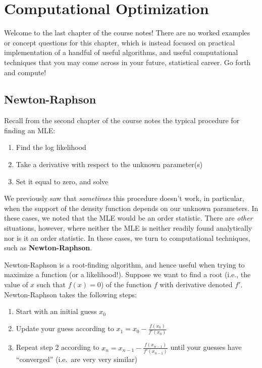 \documentclass[
  letterpaper,
  DIV=11,
  numbers=noendperiod]{scrreprt}
\begin{document}

\chapter{Computational Optimization}\label{computational-optimization}

Welcome to the last chapter of the course notes! There are no worked
examples or concept questions for this chapter, which is instead focused
on practical implementation of a handful of useful algorithms, and
useful computational techniques that you may come across in your future,
statistical career. Go forth and compute!

\section{Newton-Raphson}\label{newton-raphson}

Recall from the second chapter of the course notes the typical procedure
for finding an MLE:

\begin{enumerate}
\def\labelenumi{\arabic{enumi}.}
\item
  Find the log likelihood
\item
  Take a derivative with respect to the unknown parameter(s)
\item
  Set it equal to zero, and solve
\end{enumerate}

We previously saw that \emph{sometimes} this procedure doesn't work, in
particular, when the support of the density function depends on our
unknown parameters. In these cases, we noted that the MLE would be an
order statistic. There are \emph{other} situations, however, where
neither the MLE is neither readily found analytically nor is it an order
statistic. In these cases, we turn to computational techniques, such as
\textbf{Newton-Raphson}.

Newton-Raphson is a root-finding algorithm, and hence useful when trying
to maximize a function (or a likelihood!). Suppose we want to find a
root (i.e., the value of \(x\) such that \(f(x) = 0\)) of the function
\(f\) with derivative denoted \(f'\). Newton-Raphson takes the following
steps:

\begin{enumerate}
\def\labelenumi{\arabic{enumi}.}
\item
  Start with an initial guess \(x_0\)
\item
  Update your guess according to \(x_1 = x_0 - \frac{f(x_0)}{f'(x_0)}\)
\item
  Repeat step 2 according to
  \(x_n = x_{n-1} - \frac{f(x_{n-1})}{f'(x_{n-1})}\) until your guesses
  have ``converged'' (i.e.~are very very similar)
\end{enumerate}
\end{document}
